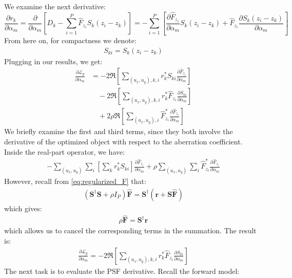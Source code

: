 \documentclass{article}
\begin{document}
We examine the next derivative:
\begin{equation}
\frac{\partial r_k}{\partial \alpha_m} = \frac{\partial}{\partial \alpha_m} \left[D_k - \sum_{i=1}^P \hat{F}_{z_i} S_k(z_i - z_k) \right] = - \sum_{i=1}^P \left[\frac{\partial \hat{F}_{z_i}}{\partial \alpha_m} S_k(z_i - z_k) + \hat{F}_{z_i} \frac{\partial S_k(z_i - z_k)}{\partial \alpha_m} \right]
\end{equation}
From here on, for compactness we denote:
\begin{align}
S_{ki} = S_k(z_i - z_k)
\end{align}
Plugging in our results, we get:
\begin{align}
\frac{\partial \mathcal{L}_g}{\partial \alpha_m} &= -2 \Re \left[\sum_{(u_x, u_y), k, i} r_k^* S_{ki} \frac{\partial \hat{F}_{z_i}}{\partial \alpha_m}\right] \nonumber\\
&\quad - 2 \Re \left[ \sum_{(u_x, u_y), k, i} r_k^* \hat{F}_{z_i} \frac{\partial S_{ki}}{\partial \alpha_m} \right] \nonumber\\
&\quad + 2 \rho \Re \left[\sum_{(u_x, u_y), i} \hat{F}^*_{z_i} \frac{\partial \hat{F}_{z_i}}{\partial \alpha_m}\right]
\end{align}
We briefly examine the first and third terms, since they both involve the derivative of the optimized object with respect to the aberration coefficient. Inside the real-part operator, we have:
\begin{align}
-\sum_{(u_x, u_y)} \sum_i \left[\sum_k r_k^* S_{ki} \right] \frac{\partial \hat{F}_{z_i}}{\partial \alpha_m} + \rho \sum_{(u_x, u_y)} \sum_i \hat{F}^*_{z_i} \frac{\partial \hat{F}_{z_i}}{\partial \alpha_m}
\end{align}
However, recall from \autoref{eq:regularized_F} that:
\begin{align}
(\mathbf{S}^\dagger \mathbf{S} + \rho I_P) \hat{\mathbf{F}} = \mathbf{S}^\dagger (\mathbf{r} + \mathbf{S} \hat{\mathbf{F}})
\end{align}
which gives:
\begin{align}
\rho \hat{\mathbf{F}} = \mathbf{S}^\dagger \mathbf{r}
\end{align}
which allows us to cancel the corresponding terms in the summation. The result is:
\begin{align}
\frac{\partial \mathcal{L}_g}{\partial \alpha_m} = - 2 \Re \left[ \sum_{(u_x, u_y), k, i} r_k^* \hat{F}_{z_i} \frac{\partial S_{ki}}{\partial \alpha_m} \right]
\end{align}
The next task is to evaluate the PSF derivative. Recall the forward model:
\end{document}
